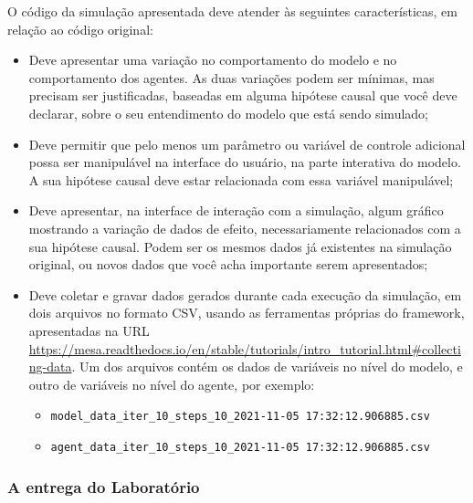 O código da simulação apresentada deve atender às seguintes características, em relação ao código original:
\begin{itemize}
    \item Deve apresentar uma variação no comportamento do modelo e no comportamento dos agentes. As duas variações podem ser mínimas, mas precisam ser justificadas, baseadas em alguma hipótese causal que você deve declarar, sobre o seu entendimento do modelo que está sendo simulado;
    \item Deve permitir que pelo menos um parâmetro ou variável de controle adicional possa ser manipulável na interface do usuário, na parte interativa do modelo. A sua hipótese causal deve estar relacionada com essa variável manipulável;
    \item Deve apresentar, na interface de interação com a simulação, algum gráfico mostrando a variação de dados de efeito, necessariamente relacionados com a sua hipótese causal. Podem ser os mesmos dados já existentes na simulação original, ou novos dados que você acha importante serem apresentados;
    \item Deve coletar e gravar dados gerados durante cada execução da simulação, em dois arquivos no formato CSV, usando as ferramentas próprias do framework, apresentadas na URL \url{https://mesa.readthedocs.io/en/stable/tutorials/intro_tutorial.html#collecting-data}. Um dos arquivos contém os dados de variáveis no nível do modelo, e outro de variáveis no nível do agente, por exemplo:
    {\footnotesize
    \begin{itemize}
        \item \verb|model_data_iter_10_steps_10_2021-11-05 17:32:12.906885.csv|
        \item \verb|agent_data_iter_10_steps_10_2021-11-05 17:32:12.906885.csv|
    \end{itemize}
    }
\end{itemize}

\subsubsection{A entrega do Laboratório}

